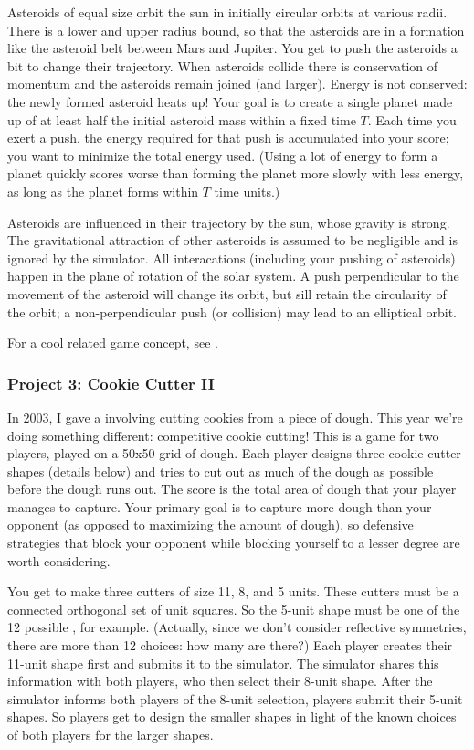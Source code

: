 Asteroids of equal size orbit the sun in initially circular orbits at
various radii.  There is a lower and upper radius bound, so that
the asteroids are in a formation like the asteroid belt between
Mars and Jupiter.  You get to
push the asteroids a bit to change their trajectory.  When asteroids
collide there is conservation of momentum and the asteroids remain
joined (and larger).  Energy is not conserved: the newly formed
asteroid heats up!  Your goal is to create a single planet made up of at
least half the initial asteroid mass within a fixed time $T$.  Each
time you exert a push, the energy required for that push is
accumulated into your score; you want to minimize the total energy
used. (Using a lot of energy to form a planet quickly scores worse
than forming the planet more slowly with less energy, as long as the
planet forms within $T$ time units.)

Asteroids are influenced in their trajectory by the sun, whose gravity
is strong.  The gravitational attraction of other asteroids is assumed
to be negligible and is ignored by the simulator.  All interacations
(including your pushing of asteroids) happen in the plane of rotation
of the solar system.  A push perpendicular to the movement of the
asteroid will change its orbit, but sill retain the circularity of the
orbit; a non-perpendicular push (or collision) may lead to an
elliptical orbit.

For a cool related game concept, see .
\subsubsection{Project 3: Cookie Cutter II}

In 2003, I gave a 
involving cutting cookies from a piece of dough.  This year we're doing something different: competitive
cookie cutting!  This is a game for two players, played on a 50x50 grid of dough.  Each player designs three
cookie cutter shapes (details below) and tries to cut out as much of the dough as possible before the
dough runs out.  The score is the total area of dough that your player manages to capture.  Your primary
goal is to capture more dough than your opponent (as opposed to maximizing the amount of dough), so
defensive strategies that block your opponent while blocking yourself to a lesser degree are worth
considering.

You get to make three cutters of size 11, 8, and 5 units.  These
cutters must be a connected orthogonal set of unit squares.  So the 5-unit
shape must be one of the 12 possible
,
for example. (Actually, since we don't consider reflective symmetries, there
are more than 12 choices: how many are there?)  Each player creates their 11-unit shape first and
submits it to the simulator.  The simulator shares this information
with both players, who then select their 8-unit shape.  After the
simulator informs both players of the 8-unit selection, players submit
their 5-unit shapes.  So players get to design the smaller shapes in
light of the known choices of both players for the larger shapes.

